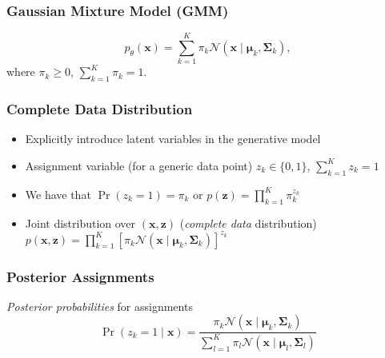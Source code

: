 \documentclass[11pt,a4paper,technote]{IEEEtran}
\newcommand{\matr}[1]{\boldsymbol{\mathbf{#1}}}
\newcommand{\vect}[1]{\boldsymbol{\mathbf{#1}}}
\newcommand{\normal}{\mathcal{N}}
\begin{document}
\subsubsection*{Gaussian Mixture Model (GMM)}
\[
  p_{\theta}(\vect{x}) = \sum_{k=1}^K \pi_k \normal(\vect{x} \mid \vect{\mu}_k,
  \matr{\Sigma}_k),
\]
where $\pi_k \geq 0$, $\sum_{k=1}^K \pi_k = 1$.

\subsubsection*{Complete Data Distribution}
\begin{itemize}
  \item Explicitly introduce latent variables in the generative model
  \item Assignment variable (for a generic data point) $z_k \in \{0,1\}$,
    $\sum_{k=1}^K z_k = 1$
  \item We have that $\Pr(z_k = 1) = \pi_k$ or $p(\vect{z}) = \prod_{k=1}^K
    \pi_k^{z_k}$
  \item Joint distribution over $(\vect{x}, \vect{z})$ (\emph{complete data}
    distribution) $p(\vect{x}, \vect{z}) = \prod_{k=1}^K {\left[ \pi_k
        \normal(\vect{x} \mid \vect{\mu}_k, \matr{\Sigma}_k)\right]}^{z_k}$
\end{itemize}

\subsubsection*{Posterior Assignments}
\emph{Posterior probabilities} for assignments
\[
  \Pr(z_k = 1 \mid \vect{x}) = \frac{\pi_k \normal(\vect{x} \mid \vect{\mu}_k,
    \matr{\Sigma}_k)}{\sum_{l=1}^K \pi_l \normal(\vect{x} \mid \vect{\mu}_l,
    \matr{\Sigma}_l)}
\]
\end{document}
